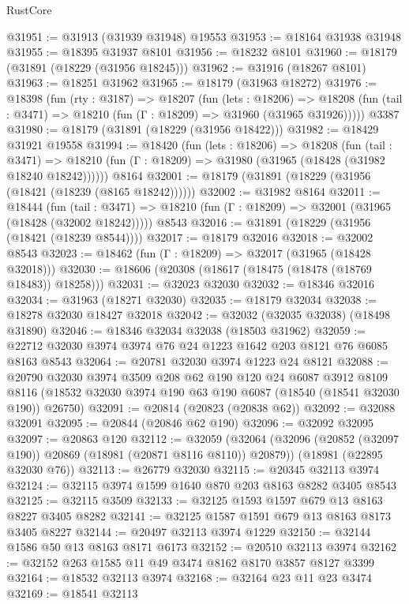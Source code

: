 \begin{lexlean}{RustCore}
\begin{coremodule}
@31951 := @31913 (@31939 @31948) @19553
@31953 := @18164 @31938 @31948
@31955 := @18395 @31937 @8101
@31956 := @18232 @8101
@31960 := @18179 (@31891 (@18229 (@31956 @18245)))
@31962 := @31916 (@18267 @8101)
@31963 := @18251 @31962
@31965 := @18179 (@31963 @18272)
@31976 := @18398
    (fun (rty : @3187) =>
    @18207
      (fun (lets : @18206) =>
      @18208 (fun (tail : @3471) => @18210 (fun (Γ : @18209) => @31960 (@31965 @31926)))))
    @3387
@31980 := @18179 (@31891 (@18229 (@31956 @18422)))
@31982 := @18429 @31921 @19558
@31994 := @18420
    (fun (lets : @18206) =>
    @18208
      (fun (tail : @3471) =>
      @18210 (fun (Γ : @18209) => @31980 (@31965 (@18428 (@31982 @18240 @18242))))))
    @8164
@32001 := @18179 (@31891 (@18229 (@31956 (@18421 (@18239 (@8165 @18242))))))
@32002 := @31982 @8164
@32011 := @18444
    (fun (tail : @3471) => @18210 (fun (Γ : @18209) => @32001 (@31965 (@18428 (@32002 @18242)))))
    @8543
@32016 := @31891 (@18229 (@31956 (@18421 (@18239 @8544))))
@32017 := @18179 @32016
@32018 := @32002 @8543
@32023 := @18462 (fun (Γ : @18209) => @32017 (@31965 (@18428 @32018)))
@32030 := @18606 (@20308 (@18617 (@18475 (@18478 (@18769 @18483)) @18258)))
@32031 := @32023 @32030
@32032 := @18346 @32016
@32034 := @31963 (@18271 @32030)
@32035 := @18179 @32034
@32038 := @18278 @32030 @18427 @32018
@32042 := @32032 (@32035 @32038) (@18498 @31890)
@32046 := @18346 @32034 @32038 (@18503 @31962)
@32059 := @22712 @32030 @3974 @3974 @76 @24 @1223 @1642 @203 @8121 @76 @6085 @8163 @8543
@32064 := @20781 @32030 @3974 @1223 @24 @8121
@32088 := @20790
    @32030
    @3974
    @3509
    @208
    @62
    @190
    @120
    @24
    @6087
    @3912
    @8109
    @8116
    (@18532 @32030 @3974 @190 @63 @190 @6087 (@18540 (@18541 @32030 @190)) @26750)
@32091 := @20814 (@20823 (@20838 @62))
@32092 := @32088 @32091
@32095 := @20844 (@20846 @62 @190)
@32096 := @32092 @32095
@32097 := @20863 @120
@32112 := @32059
    (@32064 (@32096 (@20852 (@32097 @190)) @20869 (@18981 (@20871 @8116 @8110)) @20879))
    (@18981 (@22895 @32030 @76))
@32113 := @26779 @32030
@32115 := @20345 @32113 @3974
@32124 := @32115 @3974 @1599 @1640 @870 @203 @8163 @8282 @3405 @8543
@32125 := @32115 @3509
@32133 := @32125 @1593 @1597 @679 @13 @8163 @8227 @3405 @8282
@32141 := @32125 @1587 @1591 @679 @13 @8163 @8173 @3405 @8227
@32144 := @20497 @32113 @3974 @1229
@32150 := @32144 @1586 @50 @13 @8163 @8171 @6173
@32152 := @20510 @32113 @3974
@32162 := @32152 @263 @1585 @11 @49 @3474 @8162 @8170 @3857 @8127 @3399
@32164 := @18532 @32113 @3974
@32168 := @32164 @23 @11 @23 @3474
@32169 := @18541 @32113

\end{coremodule}
\end{lexlean}

